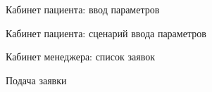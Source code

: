\newpage \begin{figure}[h]
\caption{Кабинет пациента: ввод параметров}
\label{app:patient_cabinet_parameters}
\end{figure}

\newpage \begin{figure}[h]
\caption{Кабинет пациента: сценарий ввода параметров}
\label{app:enter_parameter}
\end{figure}

\newpage \begin{figure}[h]
\caption{Кабинет менеджера: список заявок}
\label{app:manager_cabinet_bid}
\end{figure}

\newpage \begin{figure}[h]
\caption{Подача заявки}
\label{app:bid_form}
\end{figure}

